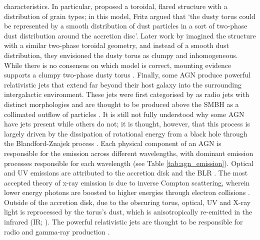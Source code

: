 characteristics. In particular, \cite{fritz_revisiting_2006} proposed a toroidal, flared structure with a distribution of grain types; in this model, Fritz argued that `the dusty torus could be represented by a smooth distribution of dust particles in a sort of two-phase dust distribution around the accretion disc'. Later work by \cite{stalevski_3d_2012} imagined the structure with a similar two-phase toroidal geometry, and instead of a smooth dust distribution, they envisioned the dusty torus as clumpy and inhomogeneous. While there is no consensus on which model is correct, mounting evidence supports a clumpy two-phase dusty torus \citep{nikutta_hypercubes_2021}. Finally, some AGN produce powerful relativistic jets that extend far beyond their host galaxy into the surrounding intergalactic environment. These jets were first categorised by \cite{fanaroff_morphology_1974} as radio jets with distinct morphologies and are thought to be produced above the SMBH as a collimated outflow of particles \citep{blandford_relativistic_2019}. It is still not fully understood why some AGN have jets present while others do not; it is thought, however, that this process is largely driven by the dissipation of rotational energy from a black hole through the Blandford-Znajek process \citep{blandford_electromagnetic_1977}. Each physical component of an AGN is responsible for the emission across different wavelengths, with dominant emission processes responsible for each wavelength (see Table \ref{tab:agn_emission}). Optical and UV emissions are attributed to the accretion disk and the BLR \citep{czerny_origin_2011}. The most accepted theory of x-ray emission is due to inverse Compton scattering, wherein lower energy photons are boosted to higher energies through electron collisions \citep{haardt_two-phase_1991, padovani_active_2017}. Outside of the accretion disk, due to the obscuring torus, optical, UV and X-ray light is reprocessed by the torus's dust, which is anisotropically re-emitted in the infrared (IR; \citealt{stern_midinfrared_2005}). The powerful relativistic jets are thought to be responsible for radio and gamma-ray production \citep{hardee_agn_2008}. 
